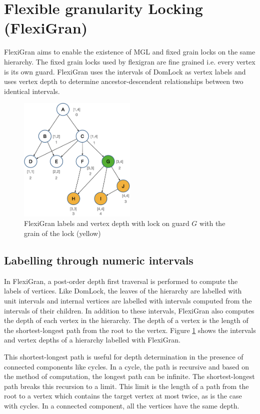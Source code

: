 \section{Flexible granularity Locking (FlexiGran)}
FlexiGran \cite{FlexiGran2024} aims to enable the existence of MGL and fixed grain locks on the same hierarchy. The fixed grain locks used by flexigran are fine grained i.e. every vertex is its own guard. FlexiGran uses the intervals of DomLock  as vertex labels and uses vertex depth to determine ancestor-descendent relationships between two identical intervals.
\begin{figure}
    \centering
    \captionsetup{justification=centering}
    \includegraphics[width=0.5\textwidth]{figures/flexigran_example_with_lock.png}
    \caption{FlexiGran labels and vertex depth with lock on guard $G$ with the grain of the lock (yellow)}
    \label{fig:flexigran_example_locked}
\end{figure}

\subsection{Labelling through numeric intervals}
In FlexiGran, a post-order depth first traversal is performed to compute the labels of vertices. Like DomLock, the leaves of the hierarchy are labelled with unit intervals and internal vertices are labelled with intervals computed from the intervals of their children. In addition to these intervals, FlexiGran also computes the depth of each vertex in the hierarchy. The depth of a vertex is the length of the shortest-longest path from the root to the vertex. Figure \ref{fig:flexigran_example_locked} shows the intervals and vertex depths of a hierarchy labelled with FlexiGran.

This shortest-longest path is useful for depth determination in the presence of connected components like cycles. In a cycle, the path is recursive and based on the method of computation, the longest path can be infinite. The shortest-longest path breaks this recursion to a limit. This limit is the length of a path from the root to a vertex which contains the target vertex at most twice, as is the case with cycles. In a connected component, all the vertices have the same depth.  


